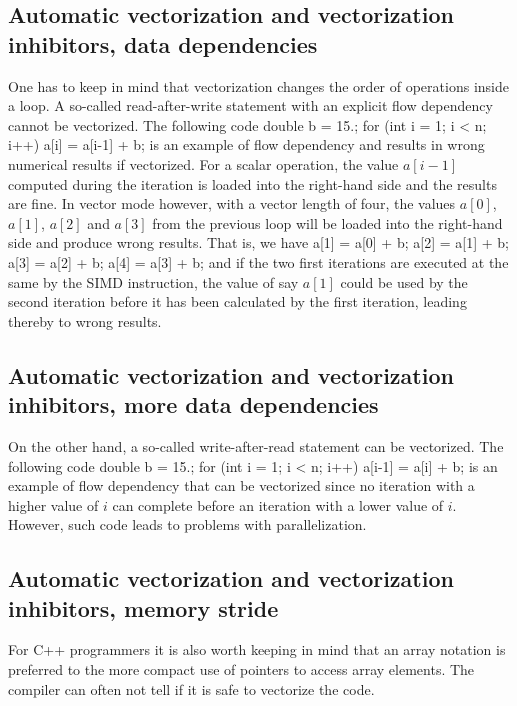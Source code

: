 \documentclass[%
oneside,                 %
final,                   %
10pt]{article}
\begin{document}
\subsection{Automatic vectorization and vectorization inhibitors, data dependencies}

One has to keep in mind that vectorization changes the order of operations inside a loop. A so-called
read-after-write statement with an explicit flow dependency cannot be vectorized. The following code
\bcppcod
  double b = 15.;
  for (int i = 1; i < n; i++) {
      a[i] = a[i-1] + b;
  }
\ecppcod
is an example of flow dependency and results in wrong numerical results if vectorized. For a scalar operation, the value $a[i-1]$ computed during the iteration is loaded into the right-hand side and the results are fine. In vector mode however, with a vector length of four, the values $a[0]$, $a[1]$, $a[2]$ and $a[3]$ from the previous loop will be loaded into the right-hand side and produce wrong results. That is, we have
\bcppcod
   a[1] = a[0] + b;
   a[2] = a[1] + b;
   a[3] = a[2] + b;
   a[4] = a[3] + b;
\ecppcod
and if the two first iterations are  executed at the same by the SIMD instruction, the value of say $a[1]$ could be used by the second iteration before it has been calculated by the first iteration, leading thereby to wrong results.

\subsection{Automatic vectorization and vectorization inhibitors, more data dependencies}

On the other hand,  a so-called 
write-after-read statement can be vectorized. The following code
\bcppcod
  double b = 15.;
  for (int i = 1; i < n; i++) {
      a[i-1] = a[i] + b;
  }
\ecppcod
is an example of flow dependency that can be vectorized since no iteration with a higher value of $i$
can complete before an iteration with a lower value of $i$. However, such code leads to problems with parallelization.


\subsection{Automatic vectorization and vectorization inhibitors, memory stride}


For C++ programmers  it is also worth keeping in mind that an array notation is preferred to the more compact use of pointers to access array elements. The compiler can often not tell if it is safe to vectorize the code. 
\end{document}

